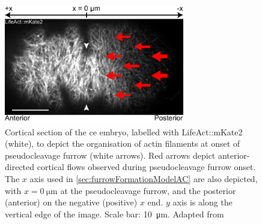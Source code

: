 \begin{figure}[h]
    \centering
    \includegraphics[width=0.7\textwidth]{ActiveMatterModel/FigureModelAC/pcFurrowXYAxis.pdf}
    \caption[Pseudocleavage furrow formation by compressive alignment of actin filaments]{Cortical section of the \acs{ce} embryo, labelled with LifeAct::mKate2 (white), to depict the organisation of actin filaments at onset of pseudocleavage furrow (white arrows). Red arrows depict anterior-directed cortical flows observed during pseudocleavage furrow onset. The $x$ axis used in \autoref{sec:furrowFormationModelAC} are also depicted, with $x = \SI{0}{\micro\meter}$ at the pseudocleavage furrow, and the posterior (anterior) on the negative (positive) $x$ end. $y$ axis is along the vertical edge of the image. Scale bar: \SI{10}{\micro\meter}. Adapted from \cite{reymann2016cortical}}
    \label{fig:pcFurrowXYAxisModelAC}
\end{figure}

